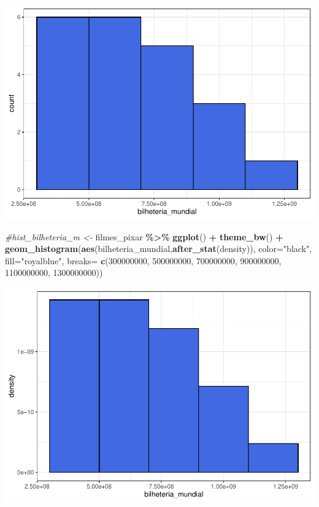 \documentclass[
]{book}
\newenvironment{Shaded}{\begin{snugshade}}{\end{snugshade}}
\newcommand{\AttributeTok}[1]{\textcolor[rgb]{0.13,0.29,0.53}{#1}}
\newcommand{\CommentTok}[1]{\textcolor[rgb]{0.56,0.35,0.01}{\textit{#1}}}
\newcommand{\DecValTok}[1]{\textcolor[rgb]{0.00,0.00,0.81}{#1}}
\newcommand{\FunctionTok}[1]{\textcolor[rgb]{0.13,0.29,0.53}{\textbf{#1}}}
\newcommand{\NormalTok}[1]{#1}
\newcommand{\SpecialCharTok}[1]{\textcolor[rgb]{0.81,0.36,0.00}{\textbf{#1}}}
\newcommand{\StringTok}[1]{\textcolor[rgb]{0.31,0.60,0.02}{#1}}
\begin{document}
\begin{center}\includegraphics{AED_files/figure-latex/hist_bilheteria2-1} \end{center}

\begin{Shaded}
\begin{Highlighting}[]
\CommentTok{\#hist\_bilheteria\_m \textless{}{-} }
\NormalTok{filmes\_pixar }\SpecialCharTok{\%\textgreater{}\%} \FunctionTok{ggplot}\NormalTok{() }\SpecialCharTok{+} \FunctionTok{theme\_bw}\NormalTok{() }\SpecialCharTok{+}
  \FunctionTok{geom\_histogram}\NormalTok{(}\FunctionTok{aes}\NormalTok{(bilheteria\_mundial,}\FunctionTok{after\_stat}\NormalTok{(density)), }
                 \AttributeTok{color=}\StringTok{"black"}\NormalTok{, }\AttributeTok{fill=}\StringTok{"royalblue"}\NormalTok{, }
                 \AttributeTok{breaks=} \FunctionTok{c}\NormalTok{(}\DecValTok{300000000}\NormalTok{, }\DecValTok{500000000}\NormalTok{, }\DecValTok{700000000}\NormalTok{, }\DecValTok{900000000}\NormalTok{, }
                           \DecValTok{1100000000}\NormalTok{, }\DecValTok{1300000000}\NormalTok{))}
\end{Highlighting}
\end{Shaded}

\begin{center}\includegraphics{AED_files/figure-latex/hist_bilheteria2-2} \end{center}
\end{document}
